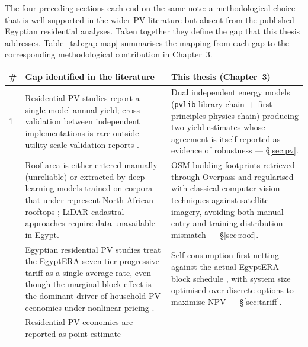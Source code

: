 The four preceding sections each end on the same note: a methodological
choice that is well-supported in the wider PV literature but absent
from the published Egyptian residential analyses. Taken together they
define the gap that this thesis addresses. Table~\ref{tab:gap-map}
summarises the mapping from each gap to the corresponding
methodological contribution in Chapter~3.

\begin{table}[h]
  \centering
  \small
  \begin{tabularx}{\textwidth}{@{} l X X @{}}
    \toprule
    \textbf{\#} & \textbf{Gap identified in the literature}
                & \textbf{This thesis (Chapter~3)} \\
    \midrule
    1 & Residential PV studies report a single-model annual yield;
        cross-validation between independent implementations is rare
        outside utility-scale validation reports
        \citep{freeman2014, polo2020}.
      & Dual independent energy models (\texttt{pvlib} library
        chain~+ first-principles physics chain) producing two
        yield estimates whose agreement is itself reported as
        evidence of robustness
        --- \S\ref{sec:pv}. \\
    \addlinespace
    2 & Roof area is either entered manually (unreliable) or
        extracted by deep-learning models trained on corpora that
        under-represent North African rooftops
        \citep{vargas-munoz2021, yu2018deepsolar}; LiDAR-cadastral
        approaches \citep{wiginton2010, brito2012} require data
        unavailable in Egypt.
      & OSM building footprints retrieved through Overpass and
        regularised with classical computer-vision techniques against
        satellite imagery, avoiding both manual entry and
        training-distribution mismatch
        --- \S\ref{sec:roof}. \\
    \addlinespace
    3 & Egyptian residential PV studies
        \citep{mahmoud2023, esmail-negm-2021} treat the EgyptERA
        seven-tier progressive tariff as a single average rate, even
        though the marginal-block effect is the dominant driver of
        household-PV economics under nonlinear pricing
        \citep{borenstein2012, darghouth2011}.
      & Self-consumption-first netting against the actual EgyptERA
        block schedule \citep{egyptera_tariff}, with system size
        optimised over discrete options to maximise NPV
        --- \S\ref{sec:tariff}. \\
    \addlinespace
    4 & Residential PV economics are reported as point-estimate

\end{tabularx}
\end{table}
